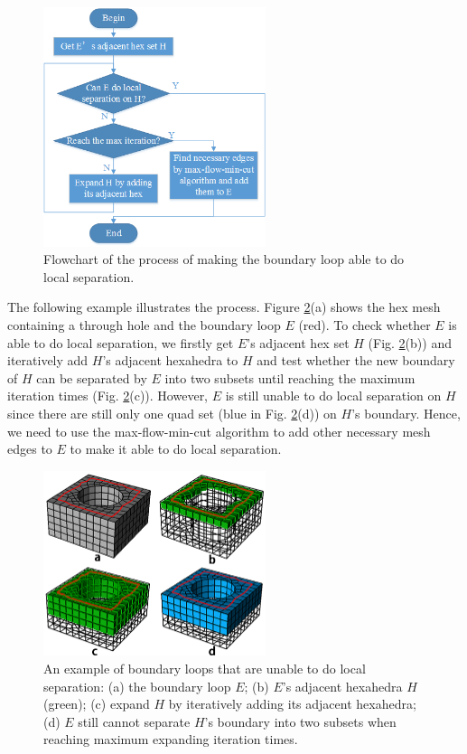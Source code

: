 \documentclass[final,5p,times,twocolumn]{elsarticle}
\begin{document}
\begin{figure}[htbp]
\begin{center}
\includegraphics[width=6.5cm]{figures/flow_local_separation.png}
\caption{Flowchart of the process of making the boundary loop able to do local separation.}
\label{fig:flow_local_sep}
\end{center}
\end{figure}

The following example illustrates the process. Figure \ref{fig:local_sep_exam}(a) shows the hex mesh containing a through hole and the boundary loop $E$ (red). To check whether $E$ is able to do local separation, we firstly get $E$'s adjacent hex set $H$ (Fig. \ref{fig:local_sep_exam}(b)) and iteratively add $H$'s adjacent hexahedra to $H$ and test whether the new boundary of $H$ can be separated by $E$ into two subsets until reaching the maximum iteration times (Fig. \ref{fig:local_sep_exam}(c)). However, $E$ is still unable to do local separation on $H$ since there are still only one quad set (blue in Fig. \ref{fig:local_sep_exam}(d)) on $H$'s boundary. Hence, we need to use the max-flow-min-cut algorithm to add other necessary mesh edges to $E$ to make it able to do local separation.

\begin{figure}[htbp]
\begin{center}
\includegraphics[width=6.5cm]{figures/local_sep_exam.png}
\caption{An example of boundary loops that are unable to do local separation: (a) the boundary loop $E$; (b) $E$'s adjacent hexahedra $H$(green); (c) expand $H$ by iteratively adding its adjacent hexahedra; (d) $E$ still cannot separate $H$'s boundary into two subsets when reaching maximum expanding iteration times.}
\label{fig:local_sep_exam}
\end{center}
\end{figure}
\end{document}
